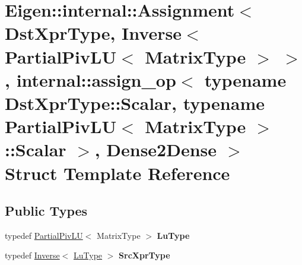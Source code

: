 \hypertarget{struct_eigen_1_1internal_1_1_assignment_3_01_dst_xpr_type_00_01_inverse_3_01_partial_piv_l_u_3_0fe0876a690a87045a6eaca571908231d}{}\section{Eigen\+::internal\+::Assignment$<$ Dst\+Xpr\+Type, Inverse$<$ Partial\+Piv\+LU$<$ Matrix\+Type $>$ $>$, internal\+::assign\+\_\+op$<$ typename Dst\+Xpr\+Type\+::Scalar, typename Partial\+Piv\+LU$<$ Matrix\+Type $>$\+::Scalar $>$, Dense2\+Dense $>$ Struct Template Reference}
\label{struct_eigen_1_1internal_1_1_assignment_3_01_dst_xpr_type_00_01_inverse_3_01_partial_piv_l_u_3_0fe0876a690a87045a6eaca571908231d}
\subsection*{Public Types}
\begin{DoxyCompactItemize}
\item 
\mbox{\label{struct_eigen_1_1internal_1_1_assignment_3_01_dst_xpr_type_00_01_inverse_3_01_partial_piv_l_u_3_0fe0876a690a87045a6eaca571908231d_aca725b44383b6d57e6c91282a1b689e7}} 
typedef \mbox{\hyperlink{class_eigen_1_1_partial_piv_l_u}{Partial\+Piv\+LU}}$<$ Matrix\+Type $>$ {\bfseries Lu\+Type}
\item 
\mbox{\label{struct_eigen_1_1internal_1_1_assignment_3_01_dst_xpr_type_00_01_inverse_3_01_partial_piv_l_u_3_0fe0876a690a87045a6eaca571908231d_a17569c851a55ed2533f588f9863d2f72}} 
typedef \mbox{\hyperlink{class_eigen_1_1_inverse}{Inverse}}$<$ \mbox{\hyperlink{class_eigen_1_1_partial_piv_l_u}{Lu\+Type}} $>$ {\bfseries Src\+Xpr\+Type}
\end{DoxyCompactItemize}
